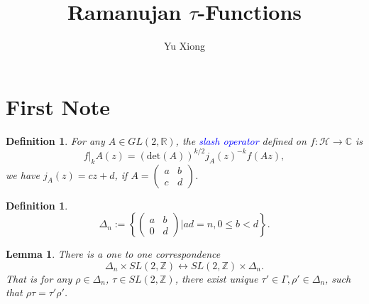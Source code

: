 \documentclass{article}
\newtheorem{definition}[theorem]{Definition}
\newtheorem{lemma}[theorem]{Lemma}
\begin{document}
\title{Ramanujan $\tau$-Functions}
\author{Yu Xiong}
\maketitle
\section{First Note}
\begin{definition}
    For any $A \in GL(2,\mathbb{R})$, the \textcolor{blue}{slash operator} defined on $f:\mathcal{H}\to \mathbb{C}$ is
    \[
        f|_kA(z)=(\text{det}(A))^{k/2}j_A(z)^{-k}f(Az),
    \] we have $j_A(z)=cz+d$, if $A=\begin{pmatrix}
        a&b\\
        c&d
    \end{pmatrix}$.
\end{definition}
\begin{definition}
    \[\Delta_n:=\left\{\begin{pmatrix}
        a&b\\
        0&d
    \end{pmatrix}\big| ad=n, 0\leq b < d\right\}.\]
\end{definition}
\begin{lemma}
    There is a one to one correspondence \[\Delta_n\times SL(2,\mathbb{Z})\leftrightarrow  SL(2,\mathbb{Z}) \times \Delta_n.\] That is for any $\rho \in \Delta_n$, $\tau \in SL(2,\mathbb{Z})$, there exist unique $\tau'\in \Gamma,\rho' \in \Delta_n$, such that $\rho \tau =\tau' \rho'$.
\end{lemma}
\end{document}
